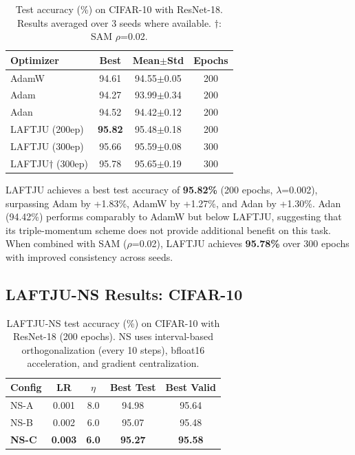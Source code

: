 \documentclass[10pt,twocolumn]{article}
\newcommand{\method}{LAFTJU}
\begin{document}
\begin{table}[t]
\centering
\caption{Test accuracy (\%) on CIFAR-10 with ResNet-18. Results averaged over 3 seeds where available. $\dagger$: SAM $\rho$=0.02.}
\label{tab:cifar10_main}
\small
\begin{tabular}{@{}lccc@{}}
\toprule
\textbf{Optimizer} & \textbf{Best} & \textbf{Mean$\pm$Std} & \textbf{Epochs} \\
\midrule
AdamW               & 94.61 & 94.55$\pm$0.05 & 200 \\
Adam                & 94.27 & 93.99$\pm$0.34 & 200 \\
Adan~\cite{adan}    & 94.52 & 94.42$\pm$0.12 & 200 \\
\midrule
\method{} (200ep)   & \textbf{95.82} & 95.48$\pm$0.18 & 200 \\
\method{} (300ep)   & 95.66 & 95.59$\pm$0.08 & 300 \\
\method{}$\dagger$ (300ep) & 95.78 & 95.65$\pm$0.19 & 300 \\
\bottomrule
\end{tabular}
\end{table}

\method{} achieves a best test accuracy of \textbf{95.82\%} (200 epochs, $\lambda$=0.002), surpassing Adam by +1.83\%, AdamW by +1.27\%, and Adan by +1.30\%. Adan (94.42\%) performs comparably to AdamW but below \method{}, suggesting that its triple-momentum scheme does not provide additional benefit on this task. When combined with SAM ($\rho$=0.02), \method{} achieves \textbf{95.78\%} over 300 epochs with improved consistency across seeds.

\subsection{\method{}-NS Results: CIFAR-10}

\begin{table}[t]
\centering
\caption{\method{}-NS test accuracy (\%) on CIFAR-10 with ResNet-18 (200 epochs). NS uses interval-based orthogonalization (every 10 steps), bfloat16 acceleration, and gradient centralization.}
\label{tab:ns_cifar10}
\begin{tabular}{@{}lcccc@{}}
\toprule
\textbf{Config} & \textbf{LR} & \textbf{$\eta$} & \textbf{Best Test} & \textbf{Best Valid} \\
\midrule
NS-A & 0.001 & 8.0 & 94.98 & 95.64 \\
NS-B & 0.002 & 6.0 & 95.07 & 95.48 \\
\textbf{NS-C} & \textbf{0.003} & \textbf{6.0} & \textbf{95.27} & \textbf{95.58} \\
\bottomrule
\end{tabular}
\end{table}
\end{document}
